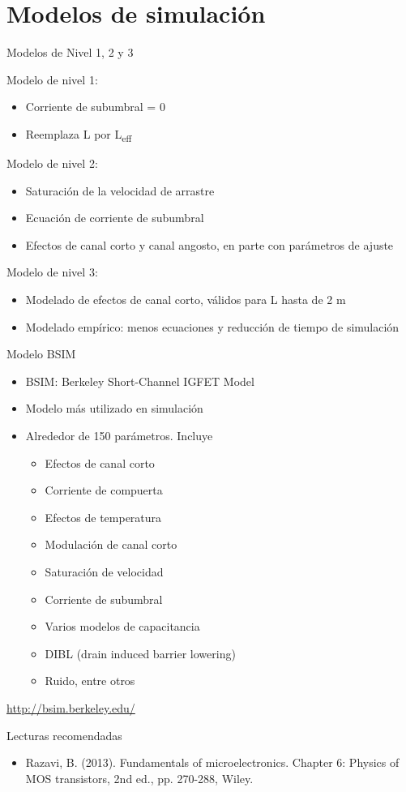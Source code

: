 \documentclass[t,aspectratio=169,10pt]{beamer}
\begin{document}
\section{Modelos de simulación}
\begin{frame}{Modelos de Nivel 1, 2 y 3}

Modelo de nivel 1:

\begin{itemize}
	\item Corriente de subumbral = 0
	\item Reemplaza L por L\textsubscript{eff}
\end{itemize}


Modelo de nivel 2:

\begin{itemize}
    \item Saturación de la velocidad de arrastre
    \item Ecuación de corriente de subumbral
    \item Efectos de canal corto y canal angosto, en parte con parámetros de ajuste
\end{itemize}


Modelo de nivel 3:

\begin{itemize}
	\item Modelado de efectos de canal corto, válidos para L hasta de 2 \textmu{}m
	\item Modelado empírico: menos ecuaciones y reducción de tiempo de simulación
\end{itemize}
\end{frame}


\begin{frame}{Modelo BSIM}

\begin{itemize}
	\item BSIM: Berkeley Short-Channel IGFET Model
	\item Modelo más utilizado en simulación
	\item Alrededor de 150 parámetros. Incluye
	\begin{itemize}
		\item Efectos de canal corto
		\item Corriente de compuerta
		\item Efectos de temperatura
		\item Modulación de canal corto
		\item Saturación de velocidad
		\item Corriente de subumbral
		\item Varios modelos de capacitancia
		\item DIBL (drain induced barrier lowering)
		\item Ruido, entre otros
	\end{itemize}
\end{itemize}

\url{http://bsim.berkeley.edu/}

\end{frame}


\begin{frame}{Lecturas recomendadas}

\begin{itemize}
    \item Razavi, B. (2013). Fundamentals of microelectronics. Chapter 6: Physics of MOS transistors, 2nd ed., pp. 270-288, Wiley.
\end{itemize}

\end{frame}
\end{document}
